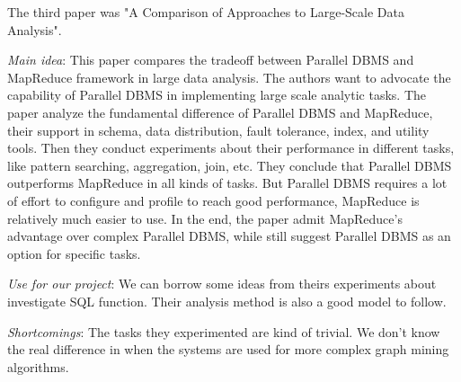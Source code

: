 The third paper was "A Comparison of Approaches to Large-Scale Data Analysis".
\cite{pavlo2009comparison}
\begin{itemize*}
\item {\em Main idea}: 
    This paper compares the tradeoff between Parallel DBMS and MapReduce framework in large data analysis. The authors want to advocate the capability of Parallel DBMS in implementing large scale analytic tasks. The paper analyze the fundamental difference of Parallel DBMS and MapReduce, their support in schema, data distribution, fault tolerance, index, and utility tools. Then they conduct experiments about their performance in different tasks, like pattern searching, aggregation, join, etc. They conclude that Parallel DBMS outperforms MapReduce in all kinds of tasks. But Parallel DBMS requires a lot of effort to configure and profile to reach good performance, MapReduce is relatively much easier to use. In the end, the paper admit MapReduce's advantage over complex Parallel DBMS, while still suggest Parallel DBMS as an option for specific tasks.
\item {\em Use for our project}:
    We can borrow some ideas from theirs experiments about investigate SQL function. Their analysis method is also a good model to follow.
\item {\em Shortcomings}:
    The tasks they experimented are kind of trivial. We don't know the real difference in when the systems are used for more complex graph mining algorithms.
\end{itemize*}

